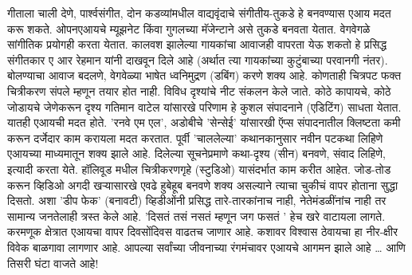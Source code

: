 गीताला चाली देणे, पार्श्वसंगीत, दोन कडव्यांमधील वाद्यवृंदाचे संगीतीय-तुकडे हे बनवण्यास एआय मदत करू शकते. ओपनएआयचे म्यूझनेट किंवा गुगलच्या मॅजेन्टाने असे तुकडे बनवता येतात. वेगवेगळे सांगीतिक प्रयोगही करता येतात. कालवश झालेल्या गायकांचा आवाजही वापरता येऊ शकतो हे प्रसिद्ध संगीतकार ए आर रेहमान यांनी दाखवून दिले आहे (अर्थात त्या गायकांच्या कुटुंबाच्या परवानगी नंतर). बोलण्याचा आवाज बदलणे, वेगवेळ्या भाषेत ध्वनिमुद्रण (डबिंग) करणे शक्य आहे. कोणताही चित्रपट फक्त चित्रीकरण संपले म्हणून तयार होत नाही. विविध दृश्यांचे नीट संकलन केले जाते. कोठे कापायचे, कोठे जोडायचे जेणेकरून दृश्य गतिमान वाटेल यांसारखे परिणाम हे कुशल संपादनाने (एडिटिंग) साधता येतात. यातही एआयची मदत होते. 'रनवे एम एल', अडोबीचे 'सेन्सेई' यांसारखी ऍप्स संपादनातील क्लिष्टता कमी करून दर्जेदार काम करायला मदत करतात.  पूर्वी 'चाललेल्या' कथानकानुसार नवीन पटकथा लिहिणे एआयच्या माध्यमातून शक्य झाले आहे. दिलेल्या सूचनेप्रमाणे कथा-दृश्य (सीन) बनवणे, संवाद लिहिणे, इत्यादी करता येते. हॉलिवूड मधील चित्रीकरणगृहे (स्टुडिओ) यासंदर्भात काम करीत आहेत. जोड-तोड करून व्हिडिओ अगदी खऱ्यासारखे एवढे हुबेहूब बनवणे शक्य असल्याने त्याचा चुकीचं वापर होताना सुद्धा दिसतो. अशा 'डीप फेक' (बनावटी) व्हिडीओंनी प्रसिद्ध तारे-तारकांनाच नाही, नेतेमंडळींनांच नाही तर सामान्य जनतेलाही त्रस्त केले आहे. 'दिसतं तसं नसतं म्हणून जग फसतं ' हेच खरे वाटायला लागते. करमणूक क्षेत्रात एआयचा वापर दिवसोंदिवस वाढतच जाणार आहे. कशावर विश्वास ठेवायचा हा नीर-क्षीर विवेक बाळगावा लागणार आहे. आपल्या सर्वांच्या जीवनाच्या रंगमंचावर एआयचे आगमन झाले आहे … आणि तिसरी घंटा वाजते आहे!